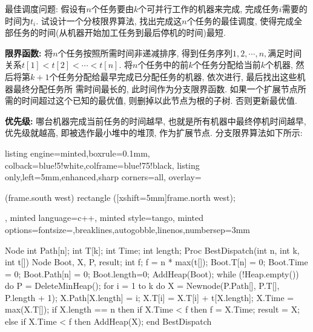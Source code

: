 \documentclass{article}
\begin{document}
\pagebreak





\begin{homeworkProblem}
	最佳调度问题: 假设有$n $个任务要由$k $个可并行工作的机器来完成, 完成任务$i $需要的时间为$t_i$. 试设计一个分枝限界算法, 找出完成这$n $个任务的最佳调度, 使得完成全部任务的时间(从机器开始加工任务到最后停机的时间)最短.

	\solution \textbf{限界函数:} 将$n$个任务按照所需时间非递减排序, 得到任务序列$1,2,\cdots,n,$满足时间关系$t[1]<t[2]<\cdots<t[n]$. 将$n$个任务中的前$k$个任务分配给当前$k$个机器, 然后将第$k+1$个任务分配给最早完成已分配任务的机器, 依次进行, 最后找出这些机器最终分配任务所
	需时间最长的, 此时间作为分支限界函数. 如果一个扩展节点所需的时间超过这个已知的最优值, 则删掉以此节点为根的子树. 否则更新最优值.

	\textbf{优先级:} 哪台机器完成当前任务的时间越早, 也就是所有机器中最终停机时间越早, 优先级就越高, 即被选作最小堆中的堆顶, 作为扩展节点. 分支限界算法如下所示:
\begin{tcblisting}{listing engine=minted,boxrule=0.1mm,
colback=blue!5!white,colframe=blue!75!black,
listing only,left=5mm,enhanced,sharp corners=all,
overlay={\begin{tcbclipinterior} (frame.south west)
rectangle ([xshift=5mm]frame.north west);\end{tcbclipinterior}},
minted language=c++,
minted style=tango,
minted options={fontsize=\small,breaklines,autogobble,linenos,numbersep=3mm}}
Node{
    int Path[n];
    int T[k];
    int Time;
    int length;
}
Proc BestDispatch(int n, int k, int t[]){
    Node Boot, X, P, result;
    int f;
    f = n * max(t[]);
    Boot.T[n] = {0};
    Boot.Time = 0;
    Boot.Path[n] = {0};
    Boot.length=0;
    AddHeap(Boot);
    while (!Heap.empty()) do {
        P = DeleteMinHeap();
        for i = 1 to k do {
            X = Newnode(P.Path[], P.T[], P.length + 1);
            X.Path[X.length] = i;
            X.T[i] = X.T[i] + t[X.length];
            X.Time = max(X.T[]);
            if X.length == n then {
                if X.Time < f then {
                    f = X.Time;
                    result = X;
                }
            }
            else {
                if X.Time < f then {
                    AddHeap(X);
                }
            }
        }
    }
}
end {BestDispatch}
\end{tcblisting}
\end{homeworkProblem}
\end{document}

